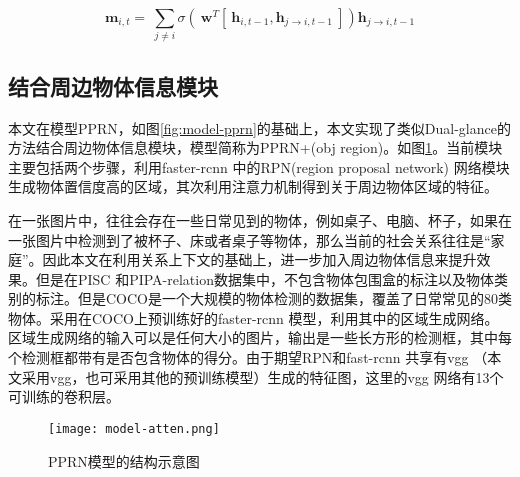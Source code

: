 \begin{equation}
    \label{eq:model-mp-atten}
	\bm{m}_{i,t} = ~\sum_{j\neq i} \sigma{(~\bm{w}^T[~\bm{h}_{i,t-1},\bm{h}_{j \to i,t-1}~]) \bm{h}_{j \to i,t-1}}	
\end{equation}



\subsection{结合周边物体信息模块}

本文在模型PPRN，如图\ref{fig:model-pprn}的基础上，本文实现了类似Dual-glance的方法结合周边物体信息模块，模型简称为PPRN+(obj region)。如图\ref{fig:model-atten}。当前模块主要包括两个步骤，利用faster-rcnn 中的RPN(region proposal network) 网络模块生成物体置信度高的区域，其次利用注意力机制得到关于周边物体区域的特征。

在一张图片中，往往会存在一些日常见到的物体，例如桌子、电脑、杯子，如果在一张图片中检测到了被杯子、床或者桌子等物体，那么当前的社会关系往往是``家庭''。因此本文在利用关系上下文的基础上，进一步加入周边物体信息来提升效果。但是在PISC 和PIPA-relation数据集中，不包含物体包围盒的标注以及物体类别的标注。但是COCO\cite{lin2014microsoft}是一个大规模的物体检测的数据集，覆盖了日常常见的80类物体。采用在COCO上预训练好的faster-rcnn 模型，利用其中的区域生成网络。区域生成网络的输入可以是任何大小的图片，输出是一些长方形的检测框，其中每个检测框都带有是否包含物体的得分。由于期望RPN和fast-rcnn 共享有vgg\cite{simonyan2015very} （本文采用vgg，也可采用其他的预训练模型）生成的特征图，这里的vgg 网络有13个可训练的卷积层。
\begin{figure}[htpb]
	\centering
	\texttt{[image: model-atten.png]}
    \caption{PPRN模型的结构示意图}
	\vspace*{-3.5mm}
	\label{fig:model-atten}
\end{figure}

